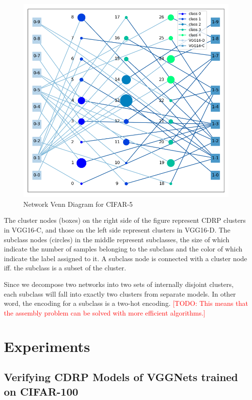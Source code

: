 \documentclass[sigplan,10pt,review]{acmart}\settopmatter{printfolios=true,printccs=false,printacmref=false}
\newcommand{\todo}[1]{\textcolor{red}{[TODO: #1]}}
\begin{document}
\begin{figure}[h]
	\centering
	\includegraphics[width=\linewidth]{fig/network_venn.png}
	\caption{Network Venn Diagram for CIFAR-5}
	\label{fig:network-venn}
\end{figure}

The cluster nodes (boxes) on the right side of the figure represent CDRP clusters in VGG16-C, and those on the left side represent clusters in VGG16-D.
The subclass nodes (circles) in the middle represent subclasses, the size of which indicate the number of samples belonging to the subclass and the color of which indicate the label assigned to it.
A subclass node is connected with a cluster node iff. the subclass is a subset of the cluster.

Since we decompose two networks into two sets of internally disjoint clusters, each subclass will fall into exactly two clusters from separate models.
In other word, the encoding for a subclass is a two-hot encoding.
\todo{This means that the assembly problem can be solved with more efficient algorithms.}

\section{Experiments}
\subsection{Verifying CDRP Models of VGGNets trained on CIFAR-100}
\end{document}
